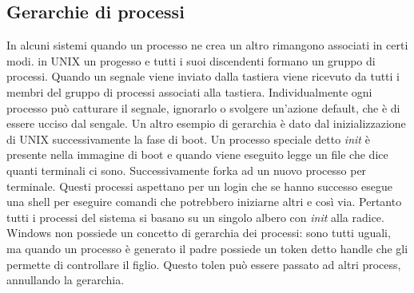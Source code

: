\subsection{Gerarchie di processi}
In alcuni sistemi quando un processo ne crea un altro rimangono associati in certi modi. in UNIX un progesso e tutti i suoi discendenti formano un gruppo di processi. Quando un segnale
viene inviato dalla tastiera viene ricevuto da tutti i membri del gruppo di processi associati alla tastiera. Individualmente ogni processo pu\`o catturare il segnale, ignorarlo o
svolgere un'azione default, che \`e di essere ucciso dal sengale. Un altro esempio di gerarchia \`e dato dal inizializzazione di UNIX successivamente la fase di boot. Un processo
speciale detto \emph{init} \`e presente nella immagine di boot e quando viene eseguito legge un file che dice quanti terminali ci sono. Successivamente forka ad un nuovo processo per
terminale. Questi processi aspettano per un login che se hanno successo esegue una shell per eseguire comandi che potrebbero iniziarne altri e cos\`i via. Pertanto tutti i processi
del sistema si basano su un singolo albero con \emph{init} alla radice. Windows non possiede un concetto di gerarchia dei processi: sono tutti uguali, ma quando un processo \`e generato
il padre possiede un token detto handle che gli permette di controllare il figlio. Questo tolen pu\`o essere passato ad altri process, annullando la gerarchia.
